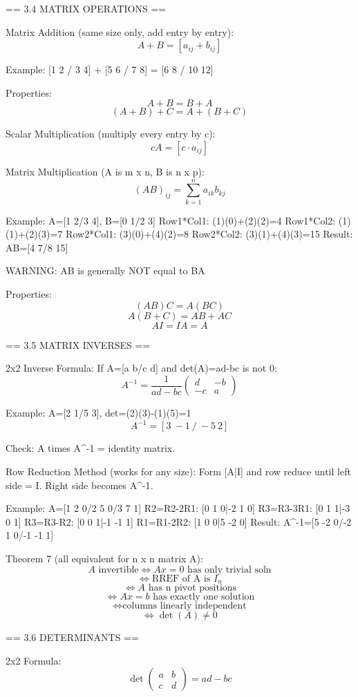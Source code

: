 == 3.4 MATRIX OPERATIONS ==

Matrix Addition (same size only, add entry by entry):
$$A + B = [a_{ij} + b_{ij}]$$

Example: [1 2 / 3 4] + [5 6 / 7 8] = [6 8 / 10 12]

Properties:
$$A+B = B+A$$
$$(A+B)+C = A+(B+C)$$

Scalar Multiplication (multiply every entry by c):
$$cA = [c \cdot a_{ij}]$$

Matrix Multiplication (A is m x n, B is n x p):
$$(AB)_{ij} = \sum_{k=1}^{n} a_{ik} b_{kj}$$

Example: A=[1 2/3 4], B=[0 1/2 3]
Row1*Col1: (1)(0)+(2)(2)=4
Row1*Col2: (1)(1)+(2)(3)=7
Row2*Col1: (3)(0)+(4)(2)=8
Row2*Col2: (3)(1)+(4)(3)=15
Result: AB=[4 7/8 15]

WARNING: AB is generally NOT equal to BA

Properties:
$$(AB)C = A(BC)$$
$$A(B+C) = AB+AC$$
$$AI = IA = A$$


== 3.5 MATRIX INVERSES ==

2x2 Inverse Formula:
If A=[a b/c d] and det(A)=ad-bc is not 0:
$$A^{-1} = \frac{1}{ad-bc}\begin{pmatrix}d & -b \\ -c & a\end{pmatrix}$$

Example: A=[2 1/5 3], det=(2)(3)-(1)(5)=1
$$A^{-1} = [3\ -1\ /\ -5\ 2]$$

Check: A times A^{-1} = identity matrix.

Row Reduction Method (works for any size):
Form [A|I] and row reduce until left side = I.
Right side becomes A^{-1}.

Example: A=[1 2 0/2 5 0/3 7 1]
R2=R2-2R1: [0 1 0|-2 1 0]
R3=R3-3R1: [0 1 1|-3 0 1]
R3=R3-R2:  [0 0 1|-1 -1 1]
R1=R1-2R2: [1 0 0|5 -2 0]
Result: A^{-1}=[5 -2 0/-2 1 0/-1 -1 1]

Theorem 7 (all equivalent for n x n matrix A):
$$A \text{ invertible} \Leftrightarrow Ax=0 \text{ has only trivial soln}$$
$$\Leftrightarrow \text{RREF of A is } I_n$$
$$\Leftrightarrow A \text{ has n pivot positions}$$
$$\Leftrightarrow Ax=b \text{ has exactly one solution}$$
$$\Leftrightarrow \text{columns linearly independent}$$
$$\Leftrightarrow \det(A) \neq 0$$


== 3.6 DETERMINANTS ==

2x2 Formula:
$$\det\begin{pmatrix}a & b \\ c & d\end{pmatrix} = ad - bc$$

